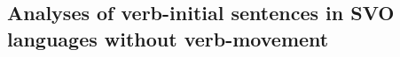 


\subsection{Analyses of verb-initial sentences in SVO languages without verb-movement}
\label{sec-aux-flat}



